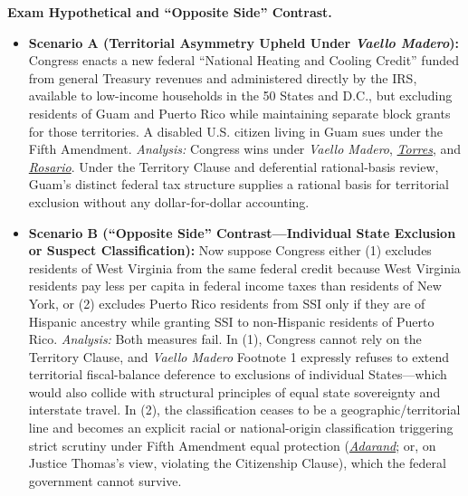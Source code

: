 \documentclass[12pt]{article}
\begin{document}
\textbf{Exam Hypothetical and ``Opposite Side'' Contrast.}
\begin{itemize}
  \item \textbf{Scenario A (Territorial Asymmetry Upheld Under \emph{Vaello Madero}):} Congress enacts a new federal ``National Heating and Cooling Credit'' funded from general Treasury revenues and administered directly by the IRS, available to low-income households in the 50 States and D.C., but excluding residents of Guam and Puerto Rico while maintaining separate block grants for those territories. A disabled U.S. citizen living in Guam sues under the Fifth Amendment. \emph{Analysis:} Congress wins under \emph{Vaello Madero}, \href{https://supreme.justia.com/cases/federal/us/435/1/}{\emph{Torres}}, and \href{https://supreme.justia.com/cases/federal/us/446/651/}{\emph{Rosario}}. Under the Territory Clause and deferential rational-basis review, Guam's distinct federal tax structure supplies a rational basis for territorial exclusion without any dollar-for-dollar accounting.
  \item \textbf{Scenario B (``Opposite Side'' Contrast---Individual State Exclusion or Suspect Classification):} Now suppose Congress either (1) excludes residents of West Virginia from the same federal credit because West Virginia residents pay less per capita in federal income taxes than residents of New York, or (2) excludes Puerto Rico residents from SSI only if they are of Hispanic ancestry while granting SSI to non-Hispanic residents of Puerto Rico. \emph{Analysis:} Both measures fail. In (1), Congress cannot rely on the Territory Clause, and \emph{Vaello Madero} Footnote 1 expressly refuses to extend territorial fiscal-balance deference to exclusions of individual States---which would also collide with structural principles of equal state sovereignty and interstate travel. In (2), the classification ceases to be a geographic/territorial line and becomes an explicit racial or national-origin classification triggering strict scrutiny under Fifth Amendment equal protection (\href{https://supreme.justia.com/cases/federal/us/515/200/}{\emph{Adarand}}; or, on Justice Thomas's view, violating the Citizenship Clause), which the federal government cannot survive.
\end{itemize}
\end{document}
